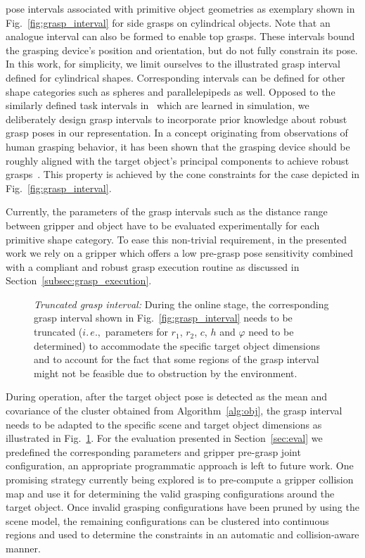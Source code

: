 pose intervals associated with primitive object geometries as exemplary shown in
Fig.~\ref{fig:grasp_interval} for side grasps on cylindrical objects. Note that an analogue interval
can also be formed to enable top grasps. These intervals bound the grasping device's position and
orientation, but do not fully constrain its pose. In this work, for simplicity, we limit ourselves
to the illustrated grasp interval defined for cylindrical shapes. Corresponding intervals can be
defined for other shape categories such as spheres and parallelepipeds as well. Opposed to the
similarly defined task intervals in~\cite{Gien08a, Gien08b} which are learned in simulation, we
deliberately design grasp intervals to incorporate prior knowledge about robust grasp poses in our
representation. In a concept originating from observations of human grasping behavior, it has been
shown that the grasping device should be roughly aligned with the target object's principal
components to achieve robust grasps~\cite{Bala12}. This property is achieved by the cone constraints
for the case depicted in Fig.~\ref{fig:grasp_interval}.

Currently, the parameters of the grasp intervals such as the distance range between gripper and
object have to be evaluated experimentally for each primitive shape category. To ease this
non-trivial requirement, in the presented work we rely on a gripper which offers a low pre-grasp
pose sensitivity combined with a compliant and robust grasp execution routine as discussed in
Section~\ref{subsec:grasp_execution}.
%
\begin{figure}[t!] 
   \centering
    \def\svgwidth{235pt} 
     
    \caption{\textit{Truncated grasp interval:} During the online stage, the corresponding grasp
      interval shown in Fig.~\ref{fig:grasp_interval} needs to be truncated ($i.\,e.,$ parameters
      for $r_1$, $r_2$, $c$, $h$ and $\varphi$ need to be determined) to accommodate the specific
      target object dimensions and to account for the fact that some regions of the grasp interval
      might not be feasible due to obstruction by the environment.}
   \label{fig:truncated_grasp_interval}
   \vspace{-0.5cm}
\end{figure}

During operation, after the target object pose is detected as the mean and covariance of the cluster
obtained from Algorithm~\ref{alg:obj}, the grasp interval needs to be adapted to the specific scene
and target object dimensions as illustrated in Fig.~\ref{fig:truncated_grasp_interval}. For the
evaluation presented in Section~\ref{sec:eval} we predefined the corresponding parameters and
gripper pre-grasp joint configuration, an appropriate programmatic approach is left to future work.
One promising strategy currently being explored is to pre-compute a gripper collision map and use it
for determining the valid grasping configurations around the target object. Once invalid grasping
configurations have been pruned by using the scene model, the remaining configurations can be
clustered into continuous regions and used to determine the constraints in an automatic and
collision-aware manner.
%
